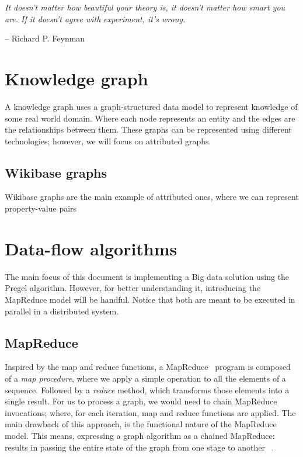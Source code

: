 \epigraph{\textit{It doesn't matter how beautiful your theory is, it doesn't matter how smart you are. If it doesn't agree with experiment, it's wrong.}}{-- \textup{Richard P. Feynman }}

\section{Knowledge graph}

A knowledge graph uses a graph-structured data model to represent knowledge of some real world domain. Where each node represents an entity and the edges are the relationships between them. These graphs can be represented using different technologies; however, we will focus on attributed graphs.

\subsection{Wikibase graphs}

Wikibase graphs are the main example of attributed ones, where we can represent property-value pairs

\section{Data-flow algorithms}

The main focus of this document is implementing a Big data solution using the Pregel algorithm. However, for better understanding it, introducing the MapReduce model will be handful. Notice that both are meant to be executed in parallel in a distributed system.

\subsection{MapReduce}

Inspired by the map and reduce functions, a MapReduce~\cite{wiki:MapReduce} program is composed of a \textit{map procedure}, where we apply a simple operation to all the elements of a sequence. Followed by a \textit{reduce} method, which transforms those elements into a single result. For us to process a graph, we would need to chain MapReduce invocations; where, for each iteration, map and reduce functions are applied. The main drawback of this approach, is the functional nature of the MapReduce model. This means, expressing a graph algorithm as a chained MapReduce: results in passing the entire state of the graph from one stage to another~\cite{10.1145/1807167.1807184} .

